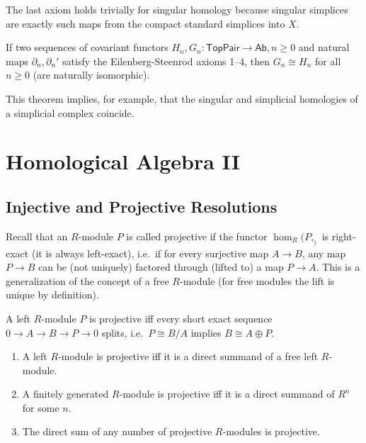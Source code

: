 \documentclass[english,letterpaper]{article}%
\numberwithin{equation}{section}
\numberwithin{figure}{section}
\numberwithin{table}{section}
\theoremstyle{definition}
\theoremstyle{definition}
\theoremstyle{definition}
\theoremstyle{plain}
\theoremstyle{plain}
\theoremstyle{plain}
\theoremstyle{plain}
\theoremstyle{remark}
\theoremstyle{remark}
\renewcommand{\geq}{\geqslant}
\begin{document}
The last axiom holds trivially for singular homology because singular simplices are exactly such maps from the compact standard simplices into $X$.


\begin{thm}
    If two sequences of covariant functors $H_n,G_n:\mathsf{TopPair}\to \mathsf{Ab}, n\geq 0$ and natural maps $\partial_n,\partial_n '$ satisfy the Eilenberg-Steenrod axioms 1--4, then $G_n\cong H_n$ for all $n\geq 0$ (are naturally isomorphic).
\end{thm}

 This theorem implies, for example, that the singular and simplicial homologies of a simplicial complex coincide.



\section{Homological Algebra II}

\subsection{Injective and Projective Resolutions}


Recall that an  $R$-module $P$ is called projective if the functor $\hom_R(P,_)$ is right-exact (it is always left-exact), i.e.\ if for every surjective map $A\to B$, any map $P\to B$ can be (not uniquely) factored through (lifted to) a map $P\to A$. This is a generalization of the concept of a free $R$-module (for free modules the lift is unique by definition).

\begin{prop}
    A left $R$-module $P$ is projective iff every short exact sequence $0\to A\to B\to P\to 0$ splits, i.e.\ $P\cong B/A$ implies $B\cong A\oplus P$.
\end{prop}

\begin{thm}
    \begin{enumerate}
        \item A left $R$-module is projective iff it is a direct summand of a free left $R$-module.
        \item A finitely generated $R$-module  is projective iff it is a direct summand of $R^n$ for some $n$.
        \item The direct sum of any number of projective $R$-modules is projective.
    \end{enumerate}
\end{thm}
\end{document}
